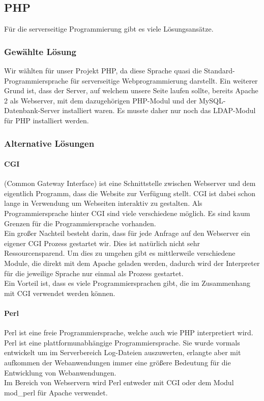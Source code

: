 \subsection{PHP}
Für die serverseitige Programmierung gibt es viele Lösungsansätze. 
\subsubsection{Gewählte Lösung}
Wir wählten für unser Projekt PHP, da diese Sprache quasi die Standard-Programmiersprache für serverseitige Webprogrammierung darstellt. Ein weiterer Grund ist, dass der Server, auf welchem unsere Seite laufen sollte, bereits Apache 2 als Webserver, mit dem dazugehörigen PHP-Modul und der MySQL-Datenbank-Server installiert waren. Es musste daher nur noch das LDAP-Modul für PHP installiert werden.
\subsubsection{Alternative Lösungen}
\paragraph{CGI} (Common Gateway Interface) ist eine Schnittstelle zwischen Webserver und dem eigentlich Programm, dass die Website zur Verfügung stellt. CGI ist dabei schon lange in Verwendung um Webseiten interaktiv zu gestalten. Als Programmiersprache hinter CGI sind viele verschiedene möglich. Es sind kaum Grenzen für die Programmiersprache vorhanden.\\
Ein großer Nachteil besteht darin, dass für jede Anfrage auf den Webserver ein eigener CGI Prozess gestartet wir. Dies ist natürlich nicht sehr Ressourcensparend. Um dies zu umgehen gibt es mittlerweile verschiedene Module, die direkt mit dem Apache geladen werden, dadurch wird der Interpreter für die jeweilige Sprache nur einmal als Prozess gestartet.\\
Ein Vorteil ist, dass es viele Programmiersprachen gibt, die im Zusammenhang mit CGI verwendet werden können. 
\paragraph{Perl}
Perl ist eine freie Programmiersprache, welche auch wie PHP interpretiert wird. Perl ist eine plattformunabhängige Programmiersprache. Sie wurde vormals entwickelt um im Serverbereich Log-Dateien auszuwerten, erlangte aber mit aufkommen der Webanwendungen immer eine größere Bedeutung für die Entwicklung von Webanwendungen.\\
Im Bereich von Webservern wird Perl entweder mit CGI oder dem Modul mod\_perl für Apache verwendet.\\
